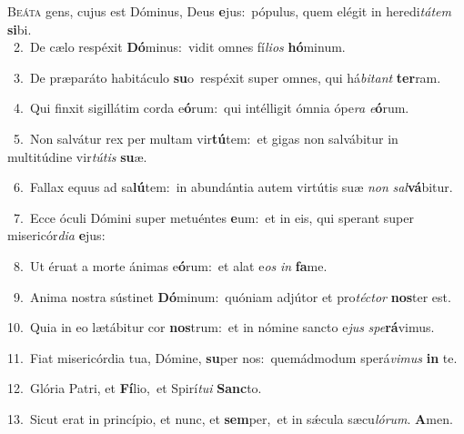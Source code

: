 \lettrine{\initial\textcolor{\initialcolor}{B}}{eáta} gens, cujus est Dóminus, Deus \textbf{e}\-jus:~\star pópulus, quem elégit in heredi\-\textit{tá}\-\textit{tem} \textbf{si}\-bi.\\
{\numbfont\textcolor{\numbcolor}{~2.}}~De cælo respéxit \textbf{Dó}\-minus:~\star vidit omnes fí\-\textit{li}\-\textit{os} \textbf{hó}\-minum.\par
{\numbfont\textcolor{\numbcolor}{~3.}}~De præparáto habitáculo \textbf{su}\-o~\star respéxit super omnes, qui há\-\textit{bi}\-\textit{tant} \textbf{ter}\-ram.\par
{\numbfont\textcolor{\numbcolor}{~4.}}~Qui finxit sigillátim corda e\-\textbf{ó}\-rum:~\star qui intélligit ómnia ópe\textit{ra} \textit{e}\-\textbf{ó}rum.\par
{\numbfont\textcolor{\numbcolor}{~5.}}~Non salvátur rex per multam vir\-\textbf{tú}\-tem:~\star et gigas non salvábitur in multitúdine vir\-\textit{tú}\-\textit{tis} \textbf{su}\-æ.\par
{\numbfont\textcolor{\numbcolor}{~6.}}~Fallax equus ad sa\-\textbf{lú}\-tem:~\star in abundántia autem virtútis suæ \textit{non} \textit{sal}\-\textbf{vá}bitur.\par
{\numbfont\textcolor{\numbcolor}{~7.}}~Ecce óculi Dómini super metuéntes \textbf{e}\-um:~\star et in eis, qui sperant super misericór\-\textit{di}\-\textit{a} \textbf{e}\-jus:\par
{\numbfont\textcolor{\numbcolor}{~8.}}~Ut éruat a morte ánimas e\-\textbf{ó}\-rum:~\star et alat e\textit{os} \textit{in} \textbf{fa}\-me.\par
{\numbfont\textcolor{\numbcolor}{~9.}}~Anima nostra sústinet \textbf{Dó}\-minum:~\star quóniam adjútor et pro\-\textit{téc}\-\textit{tor} \textbf{nos}\-ter est.\par
{\numbfont\textcolor{\numbcolor}{10.}}~Quia in eo lætábitur cor \textbf{nos}\-trum:~\star et in nómine sancto e\textit{jus} \textit{spe}\-\textbf{rá}vimus.\par
{\numbfont\textcolor{\numbcolor}{11.}}~Fiat misericórdia tua, Dómine, \textbf{su}\-per nos:~\star quemádmodum sperá\-\textit{vi}\-\textit{mus} \textbf{in} te.\par
{\numbfont\textcolor{\numbcolor}{12.}}~Glória Patri, et \textbf{Fí}\-lio,~\star et Spirí\-\textit{tu}\-\textit{i} \textbf{Sanc}\-to.\par
{\numbfont\textcolor{\numbcolor}{13.}}~Sicut erat in princípio, et nunc, et \textbf{sem}\-per,~\star et in sǽcula sæcu\-\textit{ló}\-\textit{rum}. \textbf{A}\-men.\par
